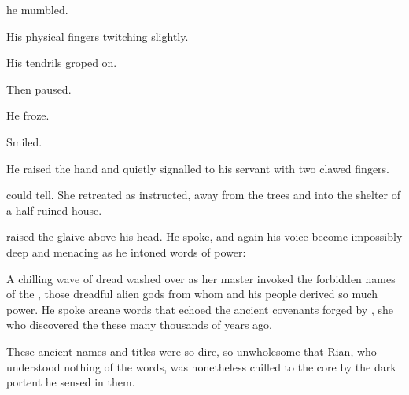 \begin{garbage}
 he mumbled.  

His physical fingers twitching slightly. 

His tendrils groped on. 

Then paused. 

He froze. 

Smiled. 


% 

He raised the hand and quietly signalled to his servant with two clawed fingers. 

 \Criseis{} could tell. She retreated as instructed, away from the trees and into the shelter of a half-ruined house. 

\Ishnaruchaefir{} raised the glaive above his head. 
He spoke, and again his voice become impossibly deep and menacing as he intoned {\TrueDraconic} words of power:


A chilling wave of dread washed over \Criseis{} as her master invoked the forbidden names of the \xzaishanns, 
those dreadful alien gods from whom \Ishnaruchaefir{} and his people derived so much power. 
He spoke arcane words that echoed the ancient covenants forged by \Tiamat, she who discovered the \xzaishanns{} these many thousands of years ago. 







\begin{comment}
\subsubsection{Rian}
\end{comment}
\new
These ancient names and titles were so dire, so unwholesome that Rian, who understood nothing of the words, was nonetheless chilled to the core by the dark portent he sensed in them. 


\end{garbage}

